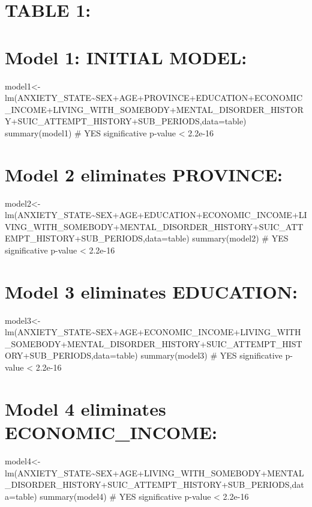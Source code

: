 \documentclass[
]{book}
\begin{document}
\hypertarget{table-1-1}{%
\chapter{TABLE 1:}\label{table-1-1}}

\hypertarget{model-1-initial-model-1}{%
\chapter{Model 1: INITIAL MODEL:}\label{model-1-initial-model-1}}

model1\textless-lm(ANXIETY\_STATE\textasciitilde SEX+AGE+PROVINCE+EDUCATION+ECONOMIC\_INCOME+LIVING\_WITH\_SOMEBODY+MENTAL\_DISORDER\_HISTORY+SUIC\_ATTEMPT\_HISTORY+SUB\_PERIODS,data=table)
summary(model1)
\# YES significative p-value \textless{} 2.2e-16

\hypertarget{model-2-eliminates-province-1}{%
\chapter{Model 2 eliminates PROVINCE:}\label{model-2-eliminates-province-1}}

model2\textless-lm(ANXIETY\_STATE\textasciitilde SEX+AGE+EDUCATION+ECONOMIC\_INCOME+LIVING\_WITH\_SOMEBODY+MENTAL\_DISORDER\_HISTORY+SUIC\_ATTEMPT\_HISTORY+SUB\_PERIODS,data=table)
summary(model2)
\# YES significative p-value \textless{} 2.2e-16

\hypertarget{model-3-eliminates-education-1}{%
\chapter{Model 3 eliminates EDUCATION:}\label{model-3-eliminates-education-1}}

model3\textless-lm(ANXIETY\_STATE\textasciitilde SEX+AGE+ECONOMIC\_INCOME+LIVING\_WITH\_SOMEBODY+MENTAL\_DISORDER\_HISTORY+SUIC\_ATTEMPT\_HISTORY+SUB\_PERIODS,data=table)
summary(model3)
\# YES significative p-value \textless{} 2.2e-16

\hypertarget{model-4-eliminates-economic_income}{%
\chapter{Model 4 eliminates ECONOMIC\_INCOME:}\label{model-4-eliminates-economic_income}}

model4\textless-lm(ANXIETY\_STATE\textasciitilde SEX+AGE+LIVING\_WITH\_SOMEBODY+MENTAL\_DISORDER\_HISTORY+SUIC\_ATTEMPT\_HISTORY+SUB\_PERIODS,data=table)
summary(model4)
\# YES significative p-value \textless{} 2.2e-16
\end{document}
